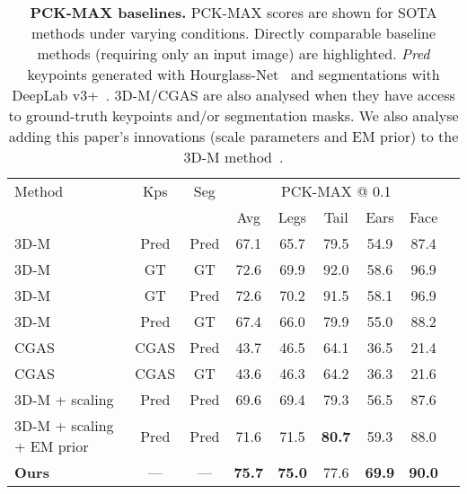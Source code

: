 \begin{table}[]
{
    \small
    \centering
    \begin{tabular}{@{}lcccccccc@{}}
    \toprule
    \multicolumn{1}{l}{Method} & 
    \multicolumn{1}{c}{Kps} & 
    \multicolumn{1}{c}{Seg} & 
    \multicolumn{5}{c}{PCK-MAX @ 0.1} \\
    \multicolumn{3}{c}{} &
    \multicolumn{1}{c}{Avg} &
    \multicolumn{1}{c}{Legs} &
    \multicolumn{1}{c}{Tail} &
    \multicolumn{1}{c}{Ears} &
    \multicolumn{1}{c}{Face} \\
    \midrule
    \rowcolor{comp} 3D-M~\cite{zuffi2017menagerie} & Pred & Pred & 67.1 & 65.7 & 79.5 & 54.9 & 87.4  \\
    \rowcolor{notcomp} 3D-M & GT & GT & 72.6 & 69.9 & 92.0 & 58.6 & 96.9 \\
    \rowcolor{notcomp} 3D-M & GT & Pred & 72.6 & 70.2 & 91.5 & 58.1 & 96.9 \\ 
    \rowcolor{notcomp} 3D-M & Pred & GT & 67.4 & 66.0 & 79.9 & 55.0 & 88.2 \\ 
    \hline
    \rowcolor{comp} CGAS~\cite{biggs2018creatures} & CGAS & Pred & 43.7 & 46.5 & 64.1 & 36.5 & 21.4  \\
    \rowcolor{notcomp} CGAS & CGAS & GT & 43.6 & 46.3 & 64.2 & 36.3 & 21.6 \\
    \hline
    \rowcolor{comp} 3D-M + scaling & Pred & Pred & 69.6 & 69.4 & 79.3 & 56.5 & 87.6 \\
    \rowcolor{comp} 3D-M + scaling + EM prior & Pred & Pred & 71.6 & 71.5 & \textbf{80.7} & 59.3 & 88.0 \\
    \hline
    \rowcolor{comp} \textbf{Ours} & --- & --- & \textbf{75.7} & \textbf{75.0} & 77.6 & \textbf{69.9} & \textbf{90.0} \\
    \bottomrule 
    \end{tabular}
    \vspace{1em}
    \caption{\label{tab:baselines}\textbf{PCK-MAX baselines.} PCK-MAX scores are shown for SOTA methods under varying conditions. Directly comparable baseline methods (requiring only an input image) are highlighted. \emph{Pred} keypoints generated with Hourglass-Net~\cite{newell2016stacked} and segmentations with DeepLab v3+~\cite{journals/corr/ChenPK0Y16}. 3D-M/CGAS are also analysed when they have access to ground-truth keypoints and/or segmentation masks. We also analyse adding this paper's innovations (scale parameters and EM prior) to the 3D-M method~\cite{zuffi2017menagerie}.}
}
\end{table}